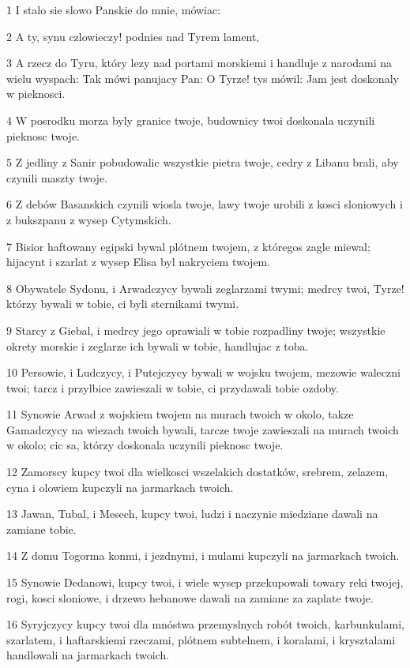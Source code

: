 \par 1 I stalo sie slowo Panskie do mnie, mówiac:
\par 2 A ty, synu czlowieczy! podnies nad Tyrem lament,
\par 3 A rzecz do Tyru, który lezy nad portami morskiemi i handluje z narodami na wielu wyspach: Tak mówi panujacy Pan: O Tyrze! tys mówil: Jam jest doskonaly w pieknosci.
\par 4 W posrodku morza byly granice twoje, budownicy twoi doskonala uczynili pieknosc twoje.
\par 5 Z jedliny z Sanir pobudowalic wszystkie pietra twoje, cedry z Libanu brali, aby czynili maszty twoje.
\par 6 Z debów Basanskich czynili wiosla twoje, lawy twoje urobili z kosci sloniowych i z bukszpanu z wysep Cytymskich.
\par 7 Bisior haftowany egipski bywal plótnem twojem, z któregos zagle miewal; hijacynt i szarlat z wysep Elisa byl nakryciem twojem.
\par 8 Obywatele Sydonu, i Arwadczycy bywali zeglarzami twymi; medrcy twoi, Tyrze! którzy bywali w tobie, ci byli sternikami twymi.
\par 9 Starcy z Giebal, i medrcy jego oprawiali w tobie rozpadliny twoje; wszystkie okrety morskie i zeglarze ich bywali w tobie, handlujac z toba.
\par 10 Persowie, i Ludczycy, i Putejczycy bywali w wojsku twojem, mezowie waleczni twoi; tarcz i przylbice zawieszali w tobie, ci przydawali tobie ozdoby.
\par 11 Synowie Arwad z wojskiem twojem na murach twoich w okolo, takze Gamadczycy na wiezach twoich bywali, tarcze twoje zawieszali na murach twoich w okolo; cic sa, którzy doskonala uczynili pieknosc twoje.
\par 12 Zamorscy kupcy twoi dla wielkosci wszelakich dostatków, srebrem, zelazem, cyna i olowiem kupczyli na jarmarkach twoich.
\par 13 Jawan, Tubal, i Mesech, kupcy twoi, ludzi i naczynie miedziane dawali na zamiane tobie.
\par 14 Z domu Togorma konmi, i jezdnymi, i mulami kupczyli na jarmarkach twoich.
\par 15 Synowie Dedanowi, kupcy twoi, i wiele wysep przekupowali towary reki twojej, rogi, kosci sloniowe, i drzewo hebanowe dawali na zamiane za zaplate twoje.
\par 16 Syryjczycy kupcy twoi dla mnóstwa przemyslnych robót twoich, karbunkulami, szarlatem, i haftarskiemi rzeczami, plótnem subtelnem, i koralami, i krysztalami handlowali na jarmarkach twoich.
